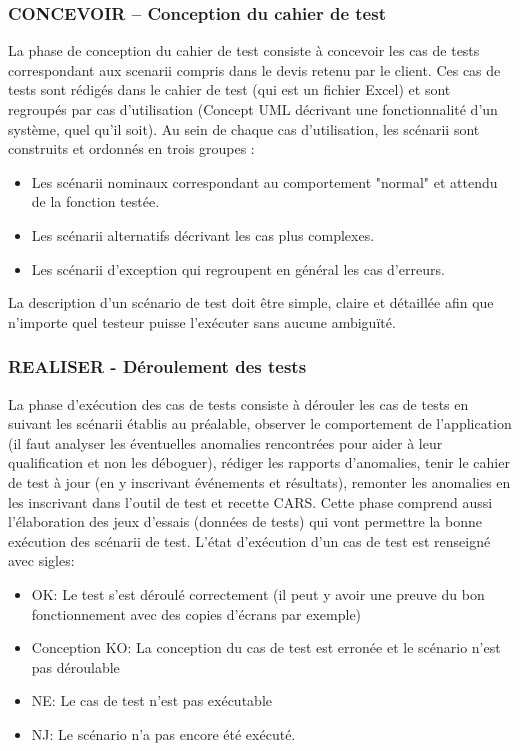\subsubsection*{CONCEVOIR – Conception du cahier de test}
La phase de conception du cahier de test consiste à concevoir les cas de tests correspondant aux scenarii compris dans le devis retenu par le client. Ces cas de tests sont rédigés dans le cahier de test (qui est un fichier Excel) et sont regroupés par cas d’utilisation (Concept UML décrivant une fonctionnalité d’un système, quel qu’il soit).  Au sein de chaque cas d’utilisation, les scénarii sont construits et ordonnés en trois groupes :
\begin{itemize}
\item Les scénarii nominaux correspondant au comportement "normal" et attendu de la fonction testée.
\item Les scénarii alternatifs décrivant les cas plus complexes.
\item Les scénarii d’exception qui regroupent en général les cas d’erreurs.
\end{itemize}
La description d’un scénario de test doit être simple, claire et détaillée afin que n’importe quel testeur puisse l’exécuter sans aucune ambiguïté. 

\subsubsection*{REALISER - Déroulement des tests}
La phase d’exécution des cas de tests consiste à dérouler les cas de tests en suivant les scénarii établis au préalable, observer le comportement de l’application (il faut analyser les éventuelles anomalies rencontrées pour aider à leur qualification et non les déboguer), rédiger les rapports d’anomalies, tenir le cahier de test à jour (en y inscrivant événements et résultats), remonter les anomalies en les inscrivant dans l’outil de test et recette CARS.
Cette phase comprend aussi l’élaboration des jeux d’essais (données de tests) qui vont permettre la bonne exécution des scénarii de test. L’état d’exécution d’un cas de test est renseigné avec sigles:
\begin{itemize}
\item OK: Le test s’est déroulé correctement (il peut y avoir une preuve du bon fonctionnement avec des copies d’écrans par exemple)
\item Conception KO: La conception du cas de test est erronée et le scénario n’est pas déroulable
\item NE: Le cas de test n’est pas exécutable
\item NJ: Le scénario n’a pas encore été exécuté.
\end{itemize}

